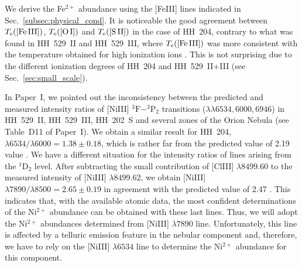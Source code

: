 \documentclass[twocolumn]{aastex63}
\newcommand{\eduardo}[1]{{\color{teal}E: #1}}
\newcommand{\Karla}[1]{{\color{violet}K: #1}}
\begin{document}
We derive the Fe$^{2+}$ abundance using the [Fe\thinspace III] lines indicated in Sec.~\ref{subsec:physical_cond}. It is noticeable the good agreement between $T_{\rm e}(\text{[Fe\thinspace III]})$, $T_{\rm e}(\text{[O\thinspace I]})$ and $T_{\rm e}(\text{[S\thinspace II]})$ in the case of HH~204, contrary to what was found in HH~529~II and HH~529~III, where $T_{\rm e}(\text{[Fe\thinspace III]})$ was more consistent with the temperature obtained for high ionization ions \citep{mendez2021}. This is not surprising due to the different ionization degrees of HH~204 and HH~529~II+III (see Sec.~\ref{sec:small_scale}). 

In Paper~I, we pointed out the inconsistency between the predicted and measured intensity ratios of [Ni\thinspace III] $^3\text{F}-^3\text{P}_2$ transitions ($\lambda \lambda 6534, 6000, 6946$) in HH~529~II, HH~529~III, HH~202~S and several zones of the Orion Nebula (see Table~D11 of Paper~I). We obtain a similar result for HH~204, $\lambda 6534/\lambda6000=1.38\pm 0.18$, which is rather far from the predicted value of 2.19 value \citep[][]{Bautista01}. We have a different situation for the intensity ratios of lines arising from the $^{1}\text{D}_2$ level. After subtracting the small contribution of [Cl\thinspace III] $\lambda 8499.60$ to the measured intensity of  [Ni\thinspace III] $\lambda 8499.62$, we obtain [Ni\thinspace III] $\lambda7890/\lambda8500=2.65\pm 0.19$ in agreement with the predicted value of 2.47 \citep{Bautista01}. This indicates that, with the available atomic data, the most confident determinations of the Ni$^{2+}$ abundance can be obtained with these last lines. Thus, we will adopt the  Ni$^{2+}$ abundances determined from  [Ni\thinspace III] $\lambda 7890$ line.  Unfortunately, this line is affected by a telluric emission feature in the nebular component and, therefore, we have to rely on the [Ni\thinspace III] $\lambda6534$ line to determine the Ni$^{2+}$ abundance for this component. %
\end{document}
